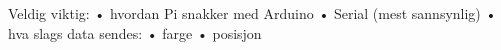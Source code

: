 
Veldig viktig:
	•	hvordan Pi snakker med Arduino
	•	Serial (mest sannsynlig)
	•	hva slags data sendes:
	•	farge
	•	posisjon